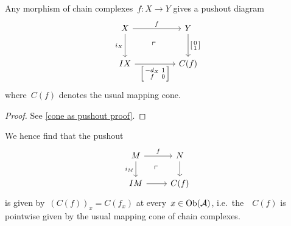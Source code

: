 \documentclass[a4paper,10pt]{scrartcl}
\begin{document}
\begin{lemma}
  \label{cone as pushout}
  Any morphism of chain complexes~$f \colon X \to Y$ gives a pushout diagram
  \[
    \begin{tikzcd}[ampersand replacement = \&, row sep = large, column sep = huge]
      X
      \arrow{r}[above]{f}
      \arrow{d}[left]{i_X}
      \arrow[phantom]{dr}{\ulcorner}
      \&
      Y
      \arrow{d}[right]{\begin{bsmallmatrix} 0 \\ 1 \end{bsmallmatrix}}
      \\
      IX
      \arrow{r}[below]{\begin{bsmallmatrix} -d_X & 1 \\ f & 0 \end{bsmallmatrix}}
      \&
      C(f)
    \end{tikzcd}
  \]
  where~$C(f)$ denotes the usual mapping cone.
\end{lemma}

\begin{proof}
  See \cref{cone as pushout proof}.
\end{proof}

We hence find that the pushout
\[
  \begin{tikzcd}
    M
    \arrow{r}[above]{f}
    \arrow{d}[left]{i_M}
      \arrow[phantom]{dr}{\ulcorner}
    &
    N
    \arrow{d}
    \\
    IM
    \arrow{r}
    &
    C(f)
  \end{tikzcd}
\]
is given by~$(C(f))_x = C(f_x)$ at every~$x \in \operatorname{Ob}(\mathcal{A})$, i.e.\ the~{\dgmodule{$\Acat$}}~$C(f)$ is pointwise given by the usual mapping cone of chain complexes.
\end{document}
